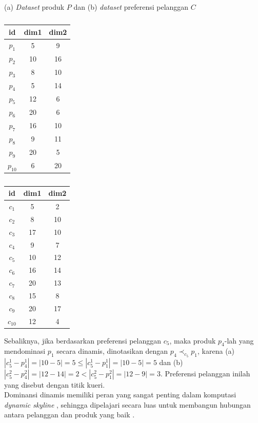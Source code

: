 \begin{table}[H]
	\caption{(a) \textit{Dataset} produk $P$ dan (b) \textit{dataset} preferensi pelanggan $C$ \label{tabel:contoh-dataset}}
	\begin{subtable}{.5\linewidth}
		\centering
		\caption{}
		\begin{tabular}{|c|c|c|}
			\hline
			\textbf{id} & \textbf{dim1} & \textbf{dim2}\\ \hline
			$p_1$ & 5 & 9\\ \hline
			$p_2$ & 10 & 16\\ \hline
			$p_3$ & 8 & 10\\ \hline
			$p_4$ & 5 & 14\\ \hline
			$p_5$ & 12 & 6\\ \hline
			$p_6$ & 20 & 6\\ \hline
			$p_7$ & 16 & 10\\ \hline
			$p_8$ & 9 & 11\\ \hline
			$p_9$ & 20 & 5\\ \hline
			$p_{10}$ & 6 & 20\\ \hline
		\end{tabular}
	\end{subtable}%
	\begin{subtable}{.5\linewidth}
		\centering
		\caption{}
		\begin{tabular}{|c|c|c|}
			\hline
			\textbf{id} & \textbf{dim1} & \textbf{dim2}\\ \hline
			$c_1$ & 5 & 2\\ \hline
			$c_2$ & 8 & 10\\ \hline
			$c_3$ & 17 & 10\\ \hline
			$c_4$ & 9 & 7\\ \hline
			$c_5$ & 10 & 12\\ \hline
			$c_6$ & 16 & 14\\ \hline
			$c_7$ & 20 & 13\\ \hline
			$c_8$ & 15 & 8\\ \hline
			$c_9$ & 20 & 17\\ \hline
			$c_{10}$ & 12 & 4\\ \hline
		\end{tabular}
	\end{subtable} 
\end{table}

Sebaliknya, jika berdasarkan preferensi pelanggan $c_5$, maka produk $p_4$-lah yang mendominasi $p_1$ secara dinamis, dinotasikan dengan $p_4 \prec_{c_5} p_1$, karena (a) $|c_5^1 - p_4^1| = |10-5| = 5 \leq |c_5^1 - p_1^1| = |10-5| = 5$ dan (b) $|c_5^2 - p_4^2| = |12-14| = 2 < |c_5^2 - p_1^2| = |12-9| = 3$. Preferensi pelanggan inilah yang disebut dengan titik kueri.\\
\tab Dominansi dinamis memiliki peran yang sangat penting dalam komputasi \textit{dynamic skyline} \cite{dynamic-skyline}, sehingga dipelajari secara luas untuk membangun hubungan antara pelanggan dan produk yang baik \cite{kmpp}.

